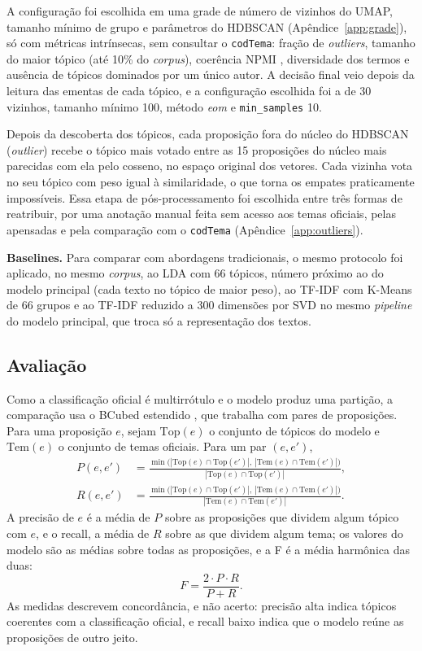 \documentclass[12pt]{article}
\begin{document}
A configuração foi escolhida em uma grade de número de vizinhos do UMAP, tamanho mínimo de grupo e parâmetros do HDBSCAN (Apêndice~\ref{app:grade}), só com métricas intrínsecas, sem consultar o \texttt{codTema}: fração de \textit{outliers}, tamanho do maior tópico (até 10\% do \textit{corpus}), coerência NPMI \citep{lau2014machine}, diversidade dos termos \citep{dieng2020topic} e ausência de tópicos dominados por um único autor. A decisão final veio depois da leitura das ementas de cada tópico, e a configuração escolhida foi a de 30 vizinhos, tamanho mínimo 100, método \textit{eom} e \texttt{min\_samples} 10.

Depois da descoberta dos tópicos, cada proposição fora do núcleo do HDBSCAN (\textit{outlier}) recebe o tópico mais votado entre as 15 proposições do núcleo mais parecidas com ela pelo cosseno, no espaço original dos vetores. Cada vizinha vota no seu tópico com peso igual à similaridade, o que torna os empates praticamente impossíveis. Essa etapa de pós-processamento foi escolhida entre três formas de reatribuir, por uma anotação manual feita sem acesso aos temas oficiais, pelas apensadas e pela comparação com o \texttt{codTema} (Apêndice~\ref{app:outliers}).

\textbf{Baselines.} Para comparar com abordagens tradicionais, o mesmo protocolo foi aplicado, no mesmo \textit{corpus}, ao LDA com 66 tópicos, número próximo ao do modelo principal (cada texto no tópico de maior peso), ao TF-IDF com K-Means de 66 grupos e ao TF-IDF reduzido a 300 dimensões por SVD no mesmo \textit{pipeline} do modelo principal, que troca só a representação dos textos.

\subsection{Avaliação}
\label{subsec:avaliacao}

Como a classificação oficial é multirrótulo e o modelo produz uma partição, a comparação usa o BCubed estendido \citep{amigo2009comparison}, que trabalha com pares de proposições. Para uma proposição $e$, sejam $\mathrm{Top}(e)$ o conjunto de tópicos do modelo e $\mathrm{Tem}(e)$ o conjunto de temas oficiais. Para um par $(e, e')$,
\begin{align}
P(e, e') &= \frac{\min\big(|\mathrm{Top}(e) \cap \mathrm{Top}(e')|,\, |\mathrm{Tem}(e) \cap \mathrm{Tem}(e')|\big)}{|\mathrm{Top}(e) \cap \mathrm{Top}(e')|}, \\
R(e, e') &= \frac{\min\big(|\mathrm{Top}(e) \cap \mathrm{Top}(e')|,\, |\mathrm{Tem}(e) \cap \mathrm{Tem}(e')|\big)}{|\mathrm{Tem}(e) \cap \mathrm{Tem}(e')|}.
\end{align}
A precisão de $e$ é a média de $P$ sobre as proposições que dividem algum tópico com $e$, e o recall, a média de $R$ sobre as que dividem algum tema; os valores do modelo são as médias sobre todas as proposições, e a F é a média harmônica das duas:
\begin{equation}
F = \frac{2 \cdot P \cdot R}{P + R}.
\end{equation}
As medidas descrevem concordância, e não acerto: precisão alta indica tópicos coerentes com a classificação oficial, e recall baixo indica que o modelo reúne as proposições de outro jeito.
\end{document}
